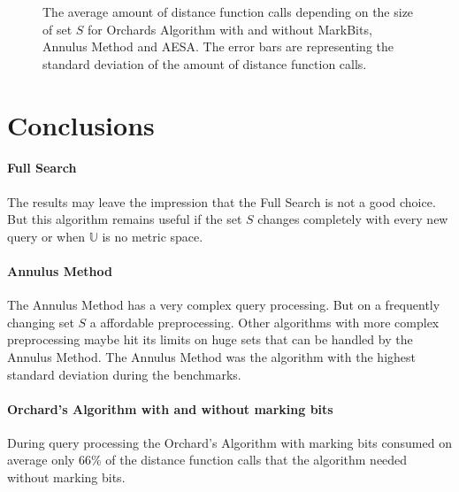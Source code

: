\documentclass[runningheads,a4paper]{llncs}
\begin{document}
\begin{figure}[H]
\begin{center}
	\end{center}
	\caption{The average amount of distance function calls depending on the size of set $S$ for Orchards Algorithm
		with and without MarkBits, Annulus Method and AESA. The error bars are representing the standard deviation
		of the amount of distance function calls.}
	\label{fig:queryprocessing}
\end{figure}

\section{Conclusions}

\paragraph{Full Search} The results may leave the impression that the Full Search is not a good choice. But this
algorithm remains useful if the set $S$ changes completely with every new query or when $\mathbb{U}$ is no metric space.

\paragraph{Annulus Method} The Annulus Method has a very complex query processing. But on a frequently changing set $S$
a affordable preprocessing. Other algorithms with more complex preprocessing maybe hit its limits on huge sets that
can be handled by the Annulus Method. The Annulus Method was the algorithm with the highest standard deviation during
the benchmarks.

\paragraph{Orchard’s Algorithm with and without marking bits} During query processing the Orchard’s Algorithm with
marking bits consumed on average only 66\% of the distance function calls that the algorithm needed without marking
bits.
\end{document}
